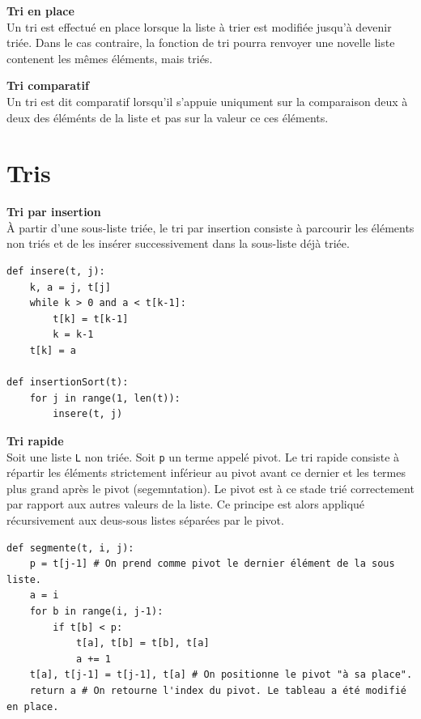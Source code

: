 \begin{defi}\textbf{Tri en place} \\
Un tri est effectué en place lorsque la liste à trier est modifiée jusqu'à devenir triée. Dans le cas contraire, la fonction de tri pourra renvoyer une novelle liste contenent les mêmes éléments, mais triés. 
\end{defi}

\begin{defi}\textbf{Tri comparatif} \\
Un tri est dit comparatif lorsqu'il s'appuie uniqument sur la comparaison deux à deux des éléménts de la liste et pas sur la valeur ce ces éléments.
\end{defi}


\section{Tris}

\begin{defi}\textbf{Tri par insertion} \\

À partir d'une sous-liste triée, le tri par insertion consiste à parcourir les éléments non triés et de les insérer successivement dans la sous-liste déjà triée. 
\end{defi}

\begin{lstlisting}
def insere(t, j):
    k, a = j, t[j]
    while k > 0 and a < t[k-1]:
        t[k] = t[k-1]
        k = k-1
    t[k] = a
    
def insertionSort(t):
    for j in range(1, len(t)):
        insere(t, j)
\end{lstlisting}


\begin{defi}\textbf{Tri rapide} \\

Soit une liste \texttt{L} non triée. Soit \texttt{p} un terme appelé pivot. Le tri rapide consiste à répartir les éléments strictement inférieur au pivot avant ce dernier et les termes plus grand après le pivot (segemntation). Le pivot est à ce stade trié correctement par rapport aux autres valeurs de la liste. Ce principe est alors appliqué récursivement aux deus-sous listes  séparées par le pivot.

\end{defi}


\begin{lstlisting}
def segmente(t, i, j):
    p = t[j-1] # On prend comme pivot le dernier élément de la sous liste. 
    a = i
    for b in range(i, j-1):
        if t[b] < p:
            t[a], t[b] = t[b], t[a]
            a += 1
    t[a], t[j-1] = t[j-1], t[a] # On positionne le pivot "à sa place".
    return a # On retourne l'index du pivot. Le tableau a été modifié en place. 
\end{lstlisting}

